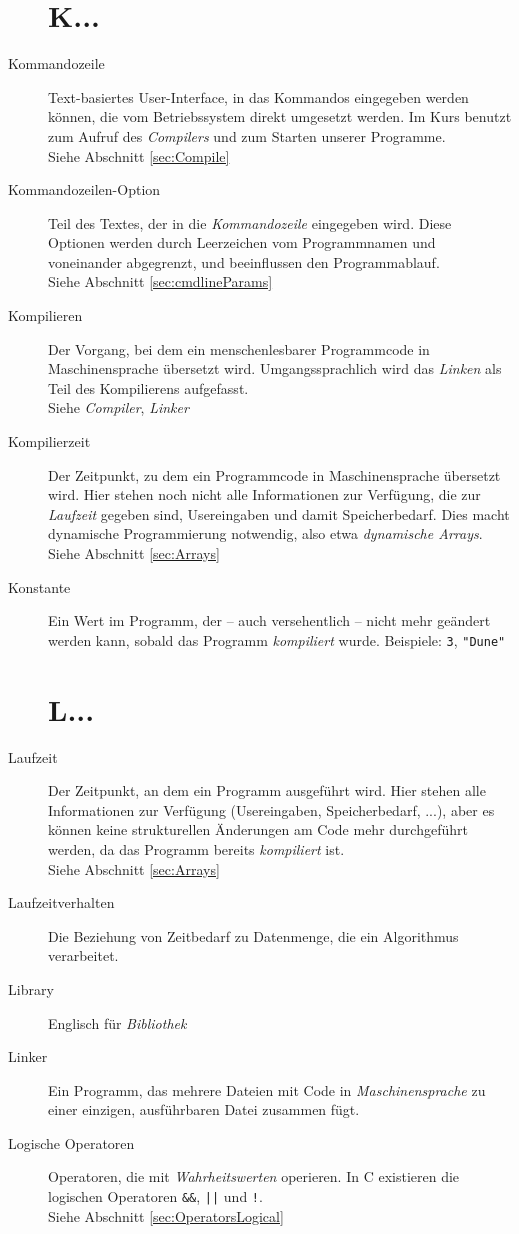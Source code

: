 \begin{appendices}
\begin{description}
\section*{K...}
\item[Kommandozeile] Text-basiertes User-Interface, in das Kommandos eingegeben werden können, die vom
	Betriebssystem direkt umgesetzt werden. Im Kurs benutzt zum Aufruf des \emph{Compilers} und zum 
	Starten unserer Programme.\\
	Siehe Abschnitt \ref{sec:Compile}
\item[Kommandozeilen-Option] Teil des Textes, der in die \emph{Kommandozeile} eingegeben wird. Diese
	Optionen werden durch Leerzeichen vom Programmnamen und voneinander abgegrenzt, und beeinflussen
	den Programmablauf.\\
	Siehe Abschnitt \ref{sec:cmdlineParams}
\item[Kompilieren] Der Vorgang, bei dem ein menschenlesbarer Programmcode in Maschinensprache übersetzt
	wird. Umgangssprachlich wird das \emph{Linken} als Teil des Kompilierens aufgefasst.\\
	Siehe \emph{Compiler}, \emph{Linker}
\item[Kompilierzeit] Der Zeitpunkt, zu dem ein Programmcode in Maschinensprache übersetzt wird. Hier
	stehen noch nicht alle Informationen zur Verfügung, die zur \emph{Laufzeit} gegeben sind, \eg
	Usereingaben und damit Speicherbedarf. Dies macht dynamische Programmierung notwendig, also etwa
	\emph{dynamische Arrays}.\\
	Siehe Abschnitt \ref{sec:Arrays}
\item[Konstante] Ein Wert im Programm, der -- auch versehentlich -- nicht mehr geändert werden kann,
	sobald das Programm \emph{kompiliert} wurde. Beispiele: \texttt{3}, \texttt{"Dune"}
	
\section*{L...}
\item[Laufzeit] Der Zeitpunkt, an dem ein Programm ausgeführt wird. Hier stehen alle Informationen zur
	Verfügung (Usereingaben, Speicherbedarf, ...), aber es können keine strukturellen Änderungen am Code
	mehr durchgeführt werden, da das Programm bereits \emph{kompiliert} ist.\\
	Siehe Abschnitt \ref{sec:Arrays}
\item[Laufzeitverhalten] Die Beziehung von Zeitbedarf zu Datenmenge, die ein Algorithmus verarbeitet.
\item[Library] Englisch für \emph{Bibliothek}
\item[Linker] Ein Programm, das mehrere Dateien mit Code in \emph{Maschinensprache} zu einer einzigen,
	ausführbaren Datei zusammen fügt.
\item[Logische Operatoren] Operatoren, die mit \emph{Wahrheitswerten} operieren. In C existieren die
	logischen Operatoren \texttt{\&\&}, \texttt{||} und \texttt{!}.\\
	Siehe Abschnitt \ref{sec:OperatorsLogical}


\end{description}
\end{appendices}
